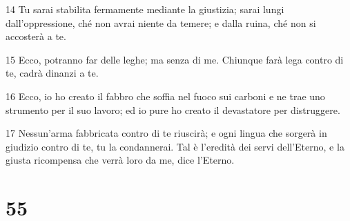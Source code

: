 \par 14 Tu sarai stabilita fermamente mediante la giustizia; sarai lungi dall'oppressione, ché non avrai niente da temere; e dalla ruina, ché non si accosterà a te.
\par 15 Ecco, potranno far delle leghe; ma senza di me. Chiunque farà lega contro di te, cadrà dinanzi a te.
\par 16 Ecco, io ho creato il fabbro che soffia nel fuoco sui carboni e ne trae uno strumento per il suo lavoro; ed io pure ho creato il devastatore per distruggere.
\par 17 Nessun'arma fabbricata contro di te riuscirà; e ogni lingua che sorgerà in giudizio contro di te, tu la condannerai. Tal è l'eredità dei servi dell'Eterno, e la giusta ricompensa che verrà loro da me, dice l'Eterno.

\chapter{55}

